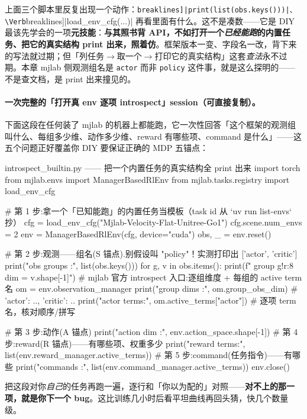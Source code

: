 上面三个脚本里反复出现一个动作：\Verb[breaklines]|print(list(obs.keys()))|、\Verb[breaklines]|load_env_cfg(...)| 再看里面有什么。这不是凑数——它是 DIY 最该先学会的一项\textbf{元技能}：\textbf{与其照书背 API，不如打开一个\emph{已经能跑}的内置任务、把它的真实结构 print 出来，照着仿}。框架版本一变、字段名一改，背下来的写法就过期；但「列任务$\to$取一个$\to$打印它的真实结构」这套\emph{查法}永不过期。本章 mjlab 侧观测组名是 \verb|actor| 而非 \verb|policy| 这件事，就是这么探明的——不是查文档，是 print 出来撞见的。

\paragraph{一次完整的「打开真 env 逐项 introspect」session（可直接复制）。}下面这段在任何装了 mjlab 的机器上都能跑，它一次性回答「这个框架的观测组叫什么、每组多少维、动作多少维、reward 有哪些项、command 是什么」——这五个问题正好覆盖你 DIY 要保证正确的 MDP 五锚点：

\begin{codebox}[Python]{introspect\_builtin.py —— 把一个内置任务的真实结构全 print 出来}
import torch
from mjlab.envs import ManagerBasedRlEnv
from mjlab.tasks.registry import load_env_cfg

# 第 1 步:拿一个「已知能跑」的内置任务当模板（task id 从 `uv run list-envs` 抄）
cfg = load_env_cfg("Mjlab-Velocity-Flat-Unitree-Go1")
cfg.scene.num_envs = 2
env = ManagerBasedRlEnv(cfg, device="cuda")
obs, _ = env.reset()

# 第 2 步:观测——组名(S 锚点).别假设叫 "policy"！实测打印出 ['actor', 'critic']
print("obs groups :", list(obs.keys()))
for g, v in obs.items():
    print(f"  group {g!r:8} dim = {v.shape[-1]}")
# mjlab 官方 introspect 入口:逐组维度 + 每组的 active term 名
om = env.observation_manager
print("group dims :", om.group_obs_dim)          # {'actor': .., 'critic': ..}
print("actor terms:", om.active_terms["actor"])  # 逐项 term 名，核对顺序/拼写

# 第 3 步:动作(A 锚点)
print("action dim :", env.action_space.shape[-1])
# 第 4 步:reward(R 锚点)——有哪些项、权重多少
print("reward terms:", list(env.reward_manager.active_terms))
# 第 5 步:command(任务指令)——有哪些
print("commands   :", list(env.command_manager.active_terms))
env.close()
\end{codebox}

把这段对你\emph{自己}的任务再跑一遍，逐行和「你以为配的」对照——\textbf{对不上的那一项，就是你下一个 bug}。这比训练几小时后看平坦曲线再回头猜，快几个数量级。

